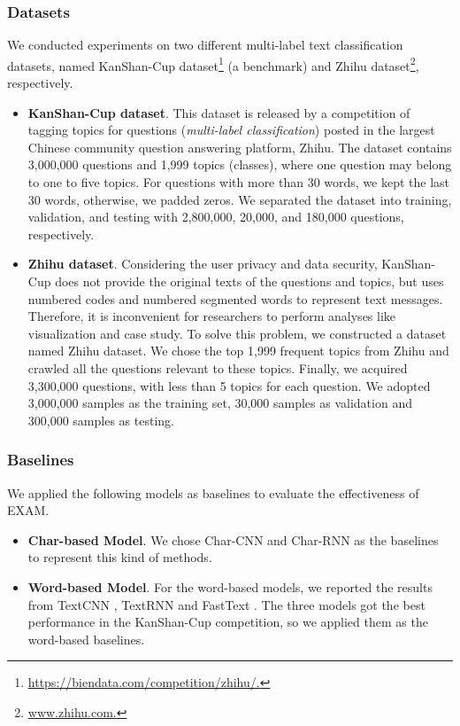 \documentclass[letterpaper]{article} \usepackage{aaai19}  \usepackage{times}  \usepackage{helvet}  \usepackage{courier}  \usepackage{url}  \usepackage{graphicx}
\begin{document}
\subsubsection{Datasets}
We conducted experiments on two different multi-label text classification datasets, named KanShan-Cup dataset\footnote{\url{https://biendata.com/competition/zhihu/.}} (a benchmark) and Zhihu dataset\footnote{\url{www.zhihu.com.}}, respectively. 
\begin{itemize}
\item \textbf{KanShan-Cup dataset}.
This dataset is released by a competition of tagging topics for questions (\textit{multi-label classification}) posted in the largest Chinese community question answering platform, Zhihu. The dataset contains 3,000,000 questions and 1,999 topics (classes), where one question may belong to one to five topics. For questions with more than 30 words, we kept the last 30 words, otherwise, we padded zeros. We separated the dataset into training, validation, and testing with 2,800,000, 20,000, and 180,000 questions, respectively.

\item \textbf{Zhihu dataset}.
Considering the user privacy and data security, KanShan-Cup does not provide the original texts of the questions and topics, but uses numbered codes and numbered segmented words to represent text messages. Therefore, it is inconvenient for researchers to perform analyses like visualization and case study. To solve this problem, we constructed a dataset named Zhihu dataset. We chose the top 1,999 frequent topics from Zhihu and crawled all the questions relevant to these topics. Finally, we acquired 3,300,000 questions, with less than 5 topics for each question. We adopted 3,000,000 samples as the training set, 30,000 samples as validation and 300,000 samples as testing.
\end{itemize}
\subsubsection{Baselines}
We applied the following models as baselines to evaluate the effectiveness of EXAM.
\begin{itemize}\item \textbf{Char-based Model}. We chose Char-CNN \cite{charcnn} and Char-RNN \cite{TextRNN} as the baselines to represent this kind of methods. 
\item \textbf{Word-based Model}. For the word-based models, we reported the results from TextCNN \cite{TextCNN}, TextRNN \cite{TextRNN} and FastText \cite{fasttext}. The three models got the best performance in the KanShan-Cup competition, so we applied them as the word-based baselines.
\end{itemize}
\end{document}
